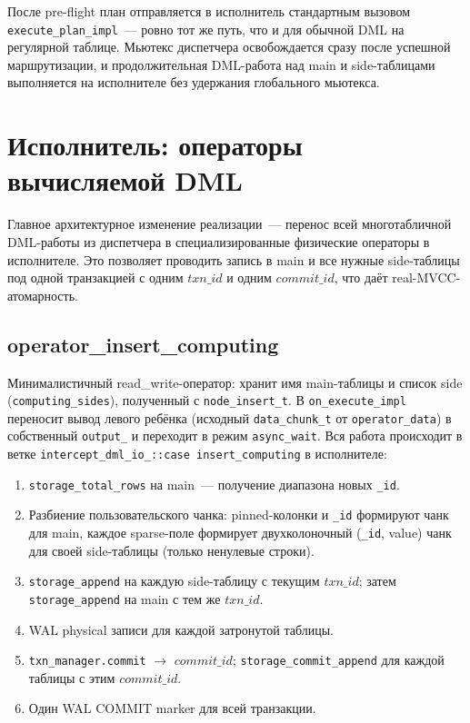 После pre-flight план отправляется в исполнитель стандартным
вызовом \texttt{execute\_plan\_impl}~--- ровно тот же путь, что и
для обычной DML на регулярной таблице. Мьютекс диспетчера
освобождается сразу после успешной маршрутизации, и продолжительная
DML-работа над main и side-таблицами выполняется на исполнителе
без удержания глобального мьютекса.

\section{Исполнитель: операторы вычисляемой DML}

Главное архитектурное изменение реализации~--- перенос всей
многотабличной DML-работы из диспетчера в специализированные
физические операторы в исполнителе. Это позволяет проводить запись
в main и все нужные side-таблицы под одной транзакцией с одним
$\mathit{txn\_id}$ и одним $\mathit{commit\_id}$, что даёт
real-MVCC-атомарность.

\subsection{operator\_insert\_computing}

Минималистичный read\_write-оператор: хранит имя main-таблицы и
список side (\texttt{computing\_sides}), полученный с
\texttt{node\_insert\_t}. В \texttt{on\_execute\_impl} переносит
вывод левого ребёнка (исходный \texttt{data\_chunk\_t} от
\texttt{operator\_data}) в собственный \texttt{output\_} и
переходит в режим \texttt{async\_wait}. Вся работа происходит в
ветке \texttt{intercept\_dml\_io\_::case insert\_computing} в
исполнителе:

\begin{enumerate}
    \item \texttt{storage\_total\_rows} на main~--- получение
    диапазона новых \texttt{\_id}.
    \item Разбиение пользовательского чанка: pinned-колонки и
    \texttt{\_id} формируют чанк для main, каждое sparse-поле
    формирует двухколоночный (\texttt{\_id}, value) чанк для своей
    side-таблицы (только ненулевые строки).
    \item \texttt{storage\_append} на каждую side-таблицу с
    текущим $\mathit{txn\_id}$; затем \texttt{storage\_append} на
    main с тем же $\mathit{txn\_id}$.
    \item WAL physical записи для каждой затронутой таблицы.
    \item \texttt{txn\_manager.commit} $\to$
    $\mathit{commit\_id}$;
    \texttt{storage\_commit\_append} для каждой таблицы с этим
    $\mathit{commit\_id}$.
    \item Один WAL COMMIT marker для всей транзакции.
\end{enumerate}

